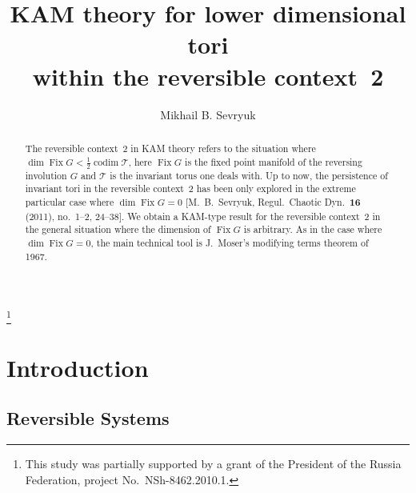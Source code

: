 \documentclass[12pt,reqno]{amsart}
\theoremstyle{definition}
\begin{document}
\title[Lower dimensional tori within the reversible context~2]{KAM theory for lower dimensional tori \\ within the reversible context~2}

\author[M.~B.~Sevryuk]{Mikhail B. Sevryuk}

\address{Institute of Energy Problems of Chemical Physics, The Russia Academy
of Sciences, Leninski\u{\i} prospect~38, Bldg.~2, Moscow 119334, Russia}



\thanks{This study was partially supported by a grant of the President of the
Russia Federation, project No.\ NSh-8462.2010.1.}



\begin{abstract}
The reversible context~2 in KAM theory refers to the situation where
$\dim\operatorname{Fix} G<\frac{1}{2}\operatorname{codim}{\mathcal T}$, here $\operatorname{Fix} G$ is the fixed point manifold
of the reversing involution $G$ and ${\mathcal T}$ is the invariant torus one deals
with. Up to now, the persistence of invariant tori in the reversible context~2
has been only explored in the extreme particular case where $\dim\operatorname{Fix} G=0$
[M.~B.~Sevryuk, Regul.\ Chaotic Dyn.\ \textbf{16} (2011), no.~1--2, 24--38].
We obtain a KAM-type result for the reversible context~2 in the general
situation where the dimension of $\operatorname{Fix} G$ is arbitrary. As in the case where
$\dim\operatorname{Fix} G=0$, the main technical tool is J.~Moser's modifying terms theorem
of 1967.
\end{abstract}

\maketitle

\baselineskip=17pt

\section{Introduction}\label{intro}

\subsection{Reversible Systems}\label{revers}
\end{document}
